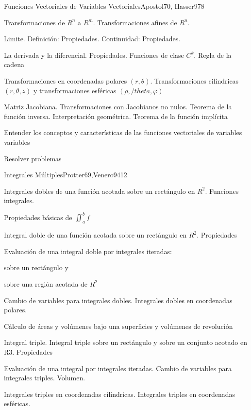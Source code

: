 \begin{syllabus}
\begin{unit}{Funciones Vectoriales de Variables Vectoriales}{Apostol70, Hasser97}{8}
   \begin{topics}
         \item  Transformaciones de $R^n$ a $R^m$. Transformaciones afines de $R^n$.
	 \item  Limite. Definición: Propiedades. Continuidad: Propiedades.
         \item  La derivada y la diferencial. Propiedades. Funciones de clase $C^k$. Regla de la cadena
	 \item  Transformaciones en coordenadas polares $(r,\theta)$. Transformaciones cilíndricas  $(r,\theta,z)$ y transformaciones esféricas $(\rho,/theta,\varphi)$
         \item  Matriz Jacobiana. Transformaciones con Jacobianos no nulos. Teorema de la función inversa. Interpretación geométrica. Teorema de la función implícita
   \end{topics}

   \begin{unitgoals}
         \item  Entender los conceptos y características de las funciones vectoriales de variables variables
         \item  Resolver problemas
   \end{unitgoals}
\end{unit}

\begin{unit}{Integrales Múltiples}{Protter69,Venero94}{12}
   \begin{topics}
         \item  Integrales dobles de una función acotada sobre un rectángulo en $R^2$. Funciones integrales.
	 \item  Propiedades básicas de $\iint_{a}^{b} f$
         \item  Integral doble de una función acotada sobre un rectángulo en $R^2$. Propiedades
	 \item  Evaluación de una integral doble por integrales iteradas:
	\begin{subtopicos}
		\item sobre un rectángulo y
		\item sobre una región acotada de $R^2$
	\end{subtopicos}
         \item  Cambio de variables para integrales dobles. Integrales dobles en coordenadas polares.
	 \item  Cálculo de áreas y volúmenes bajo una superficies y volúmenes de revolución
         \item  Integral triple. Integral triple sobre un rectángulo y sobre un conjunto acotado en R3. Propiedades
	\item Evaluación de una integral por integrales iteradas. Cambio de variables para integrales triples. Volumen.
	\item Integrales triples en coordenadas cilíndricas. Integrales triples en coordenadas esféricas.
   \end{topics}


\end{unit}
\end{syllabus}
